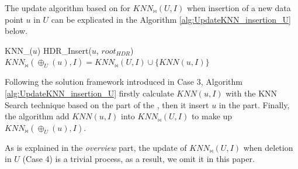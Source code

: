 
The update algorithm based on \dualtree for $KNN_{\bowtie}(U,I)$ when insertion of a new data point $u$ in $U$ can be explicated in the Algorithm \ref{alg:UpdateKNN_insertion_U} below. 

\begin{algorithm}[t]
\caption{KNN$_{\bowtie}$\_Insertion\_U($u$)}\label{alg:UpdateKNN_insertion_U}

KNN\_\dualtree($u$)\;
HDR\_Insert($u$, $root_{HDR}$)\;
$KNN_{\bowtie}(\oplus_{U}(u),I)=KNN_{\bowtie}(U,I)\cup \{KNN(u,I)\}$\;

\end{algorithm}

Following the solution framework introduced in Case 3, Algorithm \ref{alg:UpdateKNN_insertion_U} firstly calculate $KNN(u,I)$ with the KNN Search technique based on the \deltatree part of the \dualtree, then it insert $u$ in the \hdrtree part. Finally, the algorithm add $KNN(u,I)$ into $KNN_{\bowtie}(U,I)$ to make up $KNN_{\bowtie}(\oplus_{U}(u),I)$. 

As is explained in the \textit{overview} part, the update of $KNN_{\bowtie}(U,I)$ when deletion in $U$ (Case 4) is a trivial process, as a result, we omit it in this paper.

